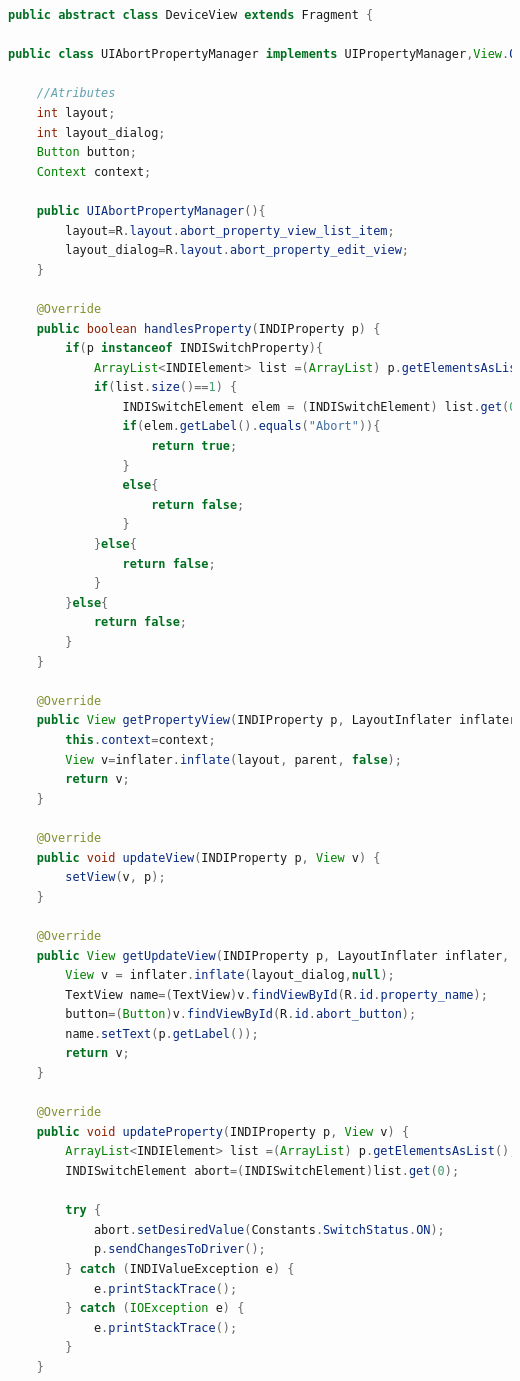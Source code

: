 \begin{lstlisting}[language=Java,caption={Clase manejadora de propiedades Abort},label={lst:abort_class}]
public abstract class DeviceView extends Fragment {

public class UIAbortPropertyManager implements UIPropertyManager,View.OnClickListener {

    //Atributes
    int layout;
    int layout_dialog;
    Button button;
    Context context;

    public UIAbortPropertyManager(){
        layout=R.layout.abort_property_view_list_item;
        layout_dialog=R.layout.abort_property_edit_view;
    }

    @Override
    public boolean handlesProperty(INDIProperty p) {
        if(p instanceof INDISwitchProperty){
            ArrayList<INDIElement> list =(ArrayList) p.getElementsAsList();
            if(list.size()==1) {
                INDISwitchElement elem = (INDISwitchElement) list.get(0);
                if(elem.getLabel().equals("Abort")){
                    return true;
                }
                else{
                    return false;
                }
            }else{
                return false;
            }
        }else{
            return false;
        }
    }

    @Override
    public View getPropertyView(INDIProperty p, LayoutInflater inflater, ViewGroup parent, Context context) {
        this.context=context;
        View v=inflater.inflate(layout, parent, false);
        return v;
    }

    @Override
    public void updateView(INDIProperty p, View v) {
        setView(v, p);
    }

    @Override
    public View getUpdateView(INDIProperty p, LayoutInflater inflater, DialogFragment fragment) {
        View v = inflater.inflate(layout_dialog,null);
        TextView name=(TextView)v.findViewById(R.id.property_name);
        button=(Button)v.findViewById(R.id.abort_button);
        name.setText(p.getLabel());
        return v;
    }

    @Override
    public void updateProperty(INDIProperty p, View v) {
        ArrayList<INDIElement> list =(ArrayList) p.getElementsAsList();
        INDISwitchElement abort=(INDISwitchElement)list.get(0);

        try {
            abort.setDesiredValue(Constants.SwitchStatus.ON);
            p.sendChangesToDriver();
        } catch (INDIValueException e) {
            e.printStackTrace();
        } catch (IOException e) {
            e.printStackTrace();
        }
    }


\end{lstlisting}
